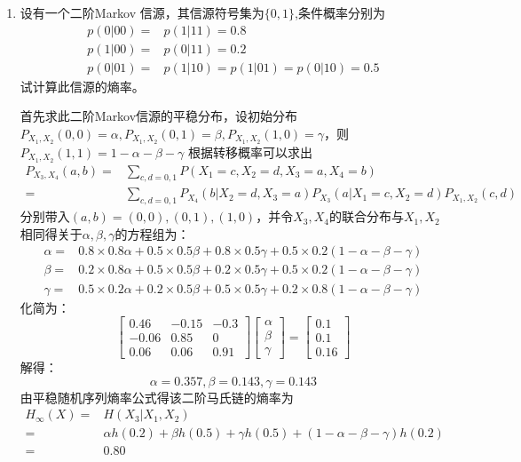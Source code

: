 \documentclass[a4paper]{article}
\begin{document}
\begin{enumerate}[label=\thehwcnt.\arabic*.]
\begin{solution}
\end{solution}
\item 设有一个二阶Markov 信源，其信源符号集为$\{0,1\}$,条件概率分别为
\begin{align*}
p(0|00) = & p(1|11) = 0.8\\
p(1|00) = & p(0|11) = 0.2\\
p(0|01) = & p(1|10) = p(1|01) = p(0|10) = 0.5
\end{align*}
试计算此信源的熵率。
\begin{solution}
首先求此二阶Markov信源的平稳分布，设初始分布$P_{X_1,X_2}(0,0)=\alpha,P_{X_1,X_2}(0,1)=\beta,P_{X_1,X_2}(1,0)=\gamma$，则
$P_{X_1,X_2}(1,1)=1-\alpha-\beta-\gamma$ 
根据转移概率可以求出
\begin{align*}
P_{X_3,X_4}(a,b) =& \sum_{c,d=0,1} P(X_1=c,X_2=d,X_3=a,X_4=b) \\
=& \sum_{c,d=0,1} P_{X_4}(b|X_2=d,X_3=a)P_{X_3}(a|X_1=c,X_2=d)P_{X_1,X_2}(c,d)
\end{align*}
分别带入$(a,b)=(0,0),(0,1),(1,0)$，并令$X_3,X_4$的联合分布与$X_1,X_2$相同得关于$\alpha,\beta,\gamma$的方程组为：
\begin{align*}
\alpha = & 0.8\times 0.8 \alpha + 0.5\times 0.5 \beta + 0.8\times 0.5\gamma +0.5\times 0.2 (1-\alpha-\beta-\gamma)\\
\beta = & 0.2\times 0.8 \alpha + 0.5\times 0.5 \beta + 0.2\times 0.5\gamma +0.5\times 0.2 (1-\alpha-\beta-\gamma)\\
\gamma = & 0.5\times 0.2 \alpha + 0.2\times 0.5 \beta + 0.5\times 0.5\gamma +0.2\times 0.8 (1-\alpha-\beta-\gamma)
\end{align*}
化简为：
$$
\begin{bmatrix}
0.46 & -0.15 & -0.3 \\
-0.06 & 0.85 & 0 \\
0.06 & 0.06 & 0.91
\end{bmatrix}
\begin{bmatrix}
\alpha\\
\beta\\
\gamma
\end{bmatrix}
=
\begin{bmatrix}
0.1\\
0.1\\
0.16
\end{bmatrix}
$$
解得：
$$
\alpha=0.357,\beta=0.143,\gamma=0.143
$$
由平稳随机序列熵率公式得该二阶马氏链的熵率为
\begin{align*}
H_{\infty}(X) = & H(X_3|X_1,X_2) \\
= & \alpha h(0.2) +\beta h(0.5)+\gamma h(0.5)+ (1-\alpha-\beta-\gamma) h(0.2) \\
= & 0.80
\end{align*}


\end{solution}
\end{enumerate}
\end{document}
